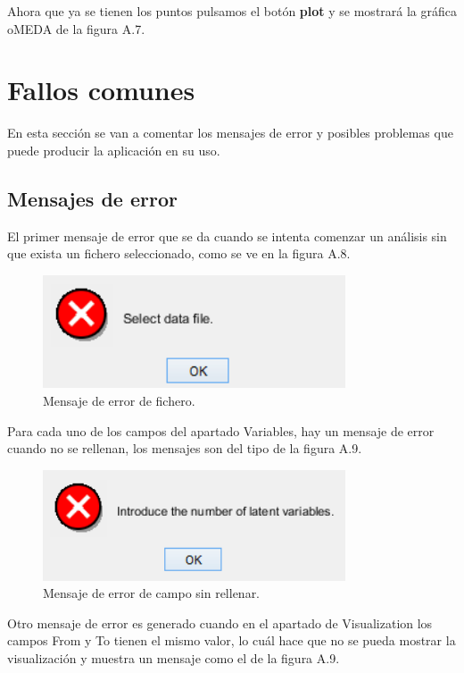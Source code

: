 Ahora que ya se tienen los puntos pulsamos el botón \textbf{plot} y se mostrará la gráfica oMEDA de la figura A.7.

\bigskip

\section{Fallos comunes}

En esta sección se van a comentar los mensajes de error y posibles problemas que puede producir la aplicación en su uso.

\subsection{Mensajes de error}

El primer mensaje de error que se da cuando se intenta comenzar un análisis sin que exista un fichero seleccionado, como se ve en la figura A.8.

\begin{figure}[H]
\centering
\includegraphics[width=0.8\textwidth]{imagenes/figuras/MU-8.png}
\caption{Mensaje de error de fichero.}
\end{figure}


Para cada uno de los campos del apartado Variables, hay un mensaje de error cuando no se rellenan, los mensajes son del tipo de la figura A.9.

\begin{figure}[H]
\centering
\includegraphics[width=0.8\textwidth]{imagenes/figuras/MU-9.png}
\caption{Mensaje de error de campo sin rellenar.}
\end{figure}


Otro mensaje de error es generado cuando en el apartado de Visualization los campos From y To tienen el mismo valor, lo cuál hace que no se pueda mostrar la visualización y muestra un mensaje como el de la figura A.9.


